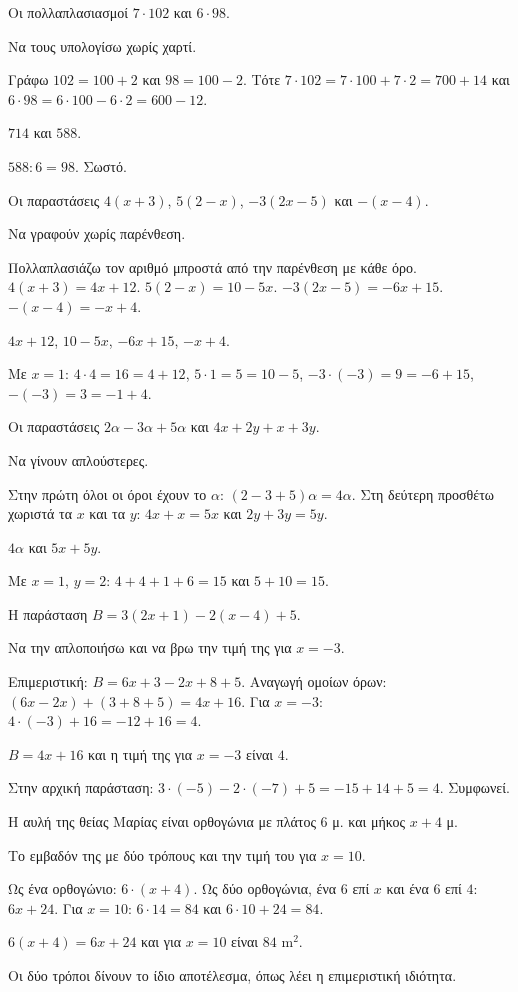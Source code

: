 \tixero Οι πολλαπλασιασμοί $7\cdot102$ και $6\cdot98$.\par
\tithelo Να τους υπολογίσω χωρίς χαρτί.\par
\possindeo Γράφω $102=100+2$ και $98=100-2$. Τότε $7\cdot102=7\cdot100+7\cdot2=700+14$ και $6\cdot98=6\cdot100-6\cdot2=600-12$.\par
\apantisi $714$ και $588$.\par
\elegxos $588:6=98$. Σωστό.

\tixero Οι παραστάσεις $4(x+3)$, $5(2-x)$, $-3(2x-5)$ και $-(x-4)$.\par
\tithelo Να γραφούν χωρίς παρένθεση.\par
\possindeo Πολλαπλασιάζω τον αριθμό μπροστά από την παρένθεση με κάθε όρο. $4(x+3)=4x+12$. $5(2-x)=10-5x$. $-3(2x-5)=-6x+15$. $-(x-4)=-x+4$.\par
\apantisi $4x+12$, $10-5x$, $-6x+15$, $-x+4$.\par
\elegxos Με $x=1$: $4\cdot4=16=4+12$, $5\cdot1=5=10-5$, $-3\cdot(-3)=9=-6+15$, $-(-3)=3=-1+4$.

\tixero Οι παραστάσεις $2\alpha-3\alpha+5\alpha$ και $4x+2y+x+3y$.\par
\tithelo Να γίνουν απλούστερες.\par
\possindeo Στην πρώτη όλοι οι όροι έχουν το $\alpha$: $(2-3+5)\alpha=4\alpha$. Στη δεύτερη προσθέτω χωριστά τα $x$ και τα $y$: $4x+x=5x$ και $2y+3y=5y$.\par
\apantisi $4\alpha$ και $5x+5y$.\par
\elegxos Με $x=1$, $y=2$: $4+4+1+6=15$ και $5+10=15$.

\tixero Η παράσταση $B=3(2x+1)-2(x-4)+5$.\par
\tithelo Να την απλοποιήσω και να βρω την τιμή της για $x=-3$.\par
\possindeo Επιμεριστική: $B=6x+3-2x+8+5$. Αναγωγή ομοίων όρων: $(6x-2x)+(3+8+5)=4x+16$. Για $x=-3$: $4\cdot(-3)+16=-12+16=4$.\par
\apantisi $B=4x+16$ και η τιμή της για $x=-3$ είναι $4$.\par
\elegxos Στην αρχική παράσταση: $3\cdot(-5)-2\cdot(-7)+5=-15+14+5=4$. Συμφωνεί.

\tixero Η αυλή της θείας Μαρίας είναι ορθογώνια με πλάτος $6$ μ. και μήκος $x+4$ μ.\par
\tithelo Το εμβαδόν της με δύο τρόπους και την τιμή του για $x=10$.\par
\possindeo Ως ένα ορθογώνιο: $6\cdot(x+4)$. Ως δύο ορθογώνια, ένα $6$ επί $x$ και ένα $6$ επί $4$: $6x+24$. Για $x=10$: $6\cdot14=84$ και $6\cdot10+24=84$.\par
\apantisi $6(x+4)=6x+24$ και για $x=10$ είναι $84$ m$^2$.\par
\elegxos Οι δύο τρόποι δίνουν το ίδιο αποτέλεσμα, όπως λέει η επιμεριστική ιδιότητα.

